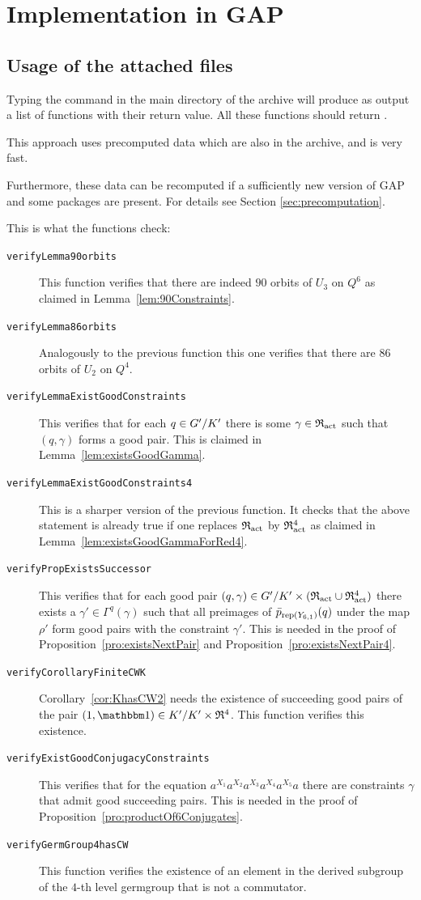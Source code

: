 \documentclass[a4paper,11pt]{amsart}
\begin{document}
\section{Implementation in GAP}
\subsection{Usage of the attached files} \label{sec:gap_verify} Typing
the command  in the main directory of the
archive will produce as output a list of functions with their return
value. All these functions should return .

This approach uses precomputed data which are also in the
archive, and is very fast.

Furthermore, these data can be recomputed if a sufficiently new
version of GAP and some packages are present. For details see Section
\ref{sec:precomputation}.

This is what the functions check:
\begin{description}
\item[\texttt{verifyLemma90orbits}] This function verifies that there
  are indeed $90$ orbits of $U_3$ on $Q^6$ as claimed in
  Lemma~\ref{lem:90Constraints}.
\item[\texttt{verifyLemma86orbits}] Analogously to the previous function 
  this one verifies that there are $86$ orbits of $U_2$ on $Q^4$. 
\item[\texttt{verifyLemmaExistGoodConstraints}] This verifies that for each 
  $q\in{G'/K'}$ there is some $\gamma\in\mathfrak{R}_{\operatorname{act}}$ such that $(q,\gamma)$ 
  forms a good pair. This is claimed in Lemma~\ref{lem:existsGoodGamma}.
\item[\texttt{verifyLemmaExistGoodConstraints4}] This is a sharper version
  of the previous function. It checks that the above statement is already true 
  if one replaces $\mathfrak{R}_{\operatorname{act}}$ by $\mathfrak{R}_{\operatorname{act}}^4$ as claimed in 
  Lemma~\ref{lem:existsGoodGammaForRed4}.
\item[\texttt{verifyPropExistsSuccessor}] This verifies that for
  each good pair $(q,\gamma) \in{G'/K'}\times(\mathfrak{R}_{\operatorname{act}}\cup \mathfrak{R}_{\operatorname{act}}^4)$ there exists 
  a $\gamma'\in\Gamma^q(\gamma)$ such that all preimages of 
  $\bar p_{\operatorname{rep}(Y_{6,1})}(q)$ under the map $\rho'$ form
  good pairs with the constraint $\gamma'$. This is needed in the proof of
  Proposition~\ref{pro:existsNextPair} and Proposition~\ref{pro:existsNextPair4}.
\item[\texttt{verifyCorollaryFiniteCWK}] Corollary~\ref{cor:KhasCW2} needs the
  existence of succeeding good pairs of the pair $(1,\id)\in\RNK{K'}{K'}\times\Red^4$.
  This function verifies this existence. 
\item[\texttt{verifyExistGoodConjugacyConstraints}] This verifies that for the equation
  $a^{X_1}a^{X_2}a^{X_3}a^{X_4}a^{X_5}a$ there are constraints $\gamma$ 
  that admit good succeeding pairs. This is needed in the proof of
  Proposition~\ref{pro:productOf6Conjugates}.
\item[\texttt{verifyGermGroup4hasCW}] This function verifies the existence of 
  an element in the derived subgroup of the $4$-th level germgroup that is not a commutator.
\end{description}
\end{document}
